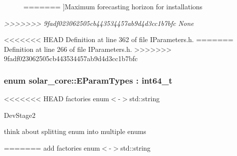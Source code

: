 \begin{Desc}
\begin{description}
{=======
}]Maximum forecasting horizon for installations \item[{\em 
>>>>>>> 9fadf023062505cb443534457ab9d4d3cc1b7bfc
\hypertarget{namespacesolar__core_ac827fdef4412a3c0d5e44d3f31908e49a6adf97f83acf6453d4a6a4b1070f3754}{}None\label{namespacesolar__core_ac827fdef4412a3c0d5e44d3f31908e49a6adf97f83acf6453d4a6a4b1070f3754}
}]\end{description}
\end{Desc}


<<<<<<< HEAD
Definition at line 362 of file I\+Parameters.\+h.
=======
Definition at line 266 of file I\+Parameters.\+h.
>>>>>>> 9fadf023062505cb443534457ab9d4d3cc1b7bfc

\hypertarget{namespacesolar__core_aa1147341e5ef7a40d68d1bd68e149362}{}
\subsubsection[{E\+Param\+Types}]{\setlength{\rightskip}{0pt plus 5cm}enum {\bf solar\+\_\+core\+::\+E\+Param\+Types} \+: int64\+\_\+t\hspace{0.3cm}{\ttfamily [strong]}}\label{namespacesolar__core_aa1147341e5ef7a40d68d1bd68e149362}
<<<<<<< HEAD
factories enum$<$-\/$>$std\+::string

\begin{DoxyRefDesc}{Dev\+Stage2}
\item[\hyperlink{_dev_stage2__DevStage2000026}{Dev\+Stage2}]think about splitting enum into multiple enums\end{DoxyRefDesc}
=======
add factories enum$<$-\/$>$std\+::string

